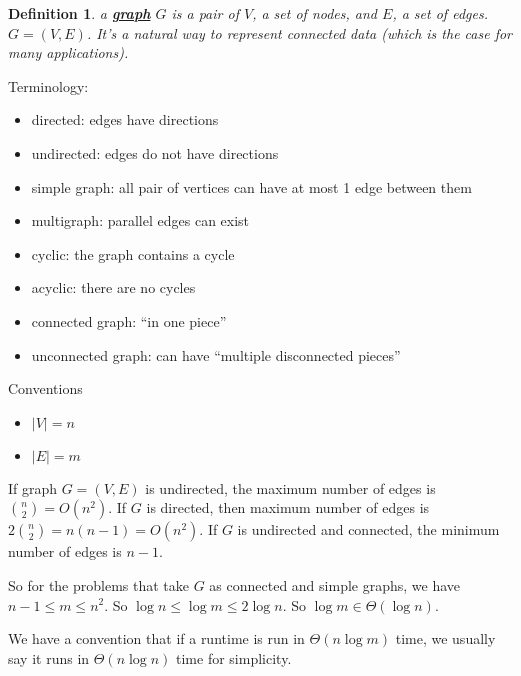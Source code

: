 \documentclass[twoside]{article}
\newtheorem{protodefinition}[prototheorem]{Definition}
\newenvironment{definition}
{\colorlet{shadecolor}{cyan!15}\begin{shaded}\begin{protodefinition}\normalfont}
		{\end{protodefinition}\end{shaded}}
\begin{document}
\begin{definition}
	a \textbf{\underline{graph}} $G$ is a pair of $V$, a set of nodes, and $E$, a set of edges. $G = (V, E)$. It's a natural way to represent connected data (which is the case for many applications). 
\end{definition}
Terminology: 
\begin{itemize}
	\item directed: edges have directions
	\item undirected: edges do not have directions
	\item simple graph: all pair of vertices can have at most 1 edge between them
	\item multigraph: parallel edges can exist
	\item cyclic: the graph contains a cycle
	\item acyclic: there are no cycles
	\item connected graph: ``in one piece''
	\item unconnected graph: can have ``multiple disconnected pieces''
\end{itemize}
Conventions
\begin{itemize}
	\item $|V| = n$
	\item $|E| = m$
\end{itemize}

If graph $G = (V, E)$ is undirected, the maximum number of edges is ${n \choose 2} = O(n^2)$. If $G$ is directed, then maximum number of edges is $2{n \choose 2} = n(n-1) = O(n^2)$. If $G$ is undirected and connected, the minimum number of edges is $n-1$. 

So for the problems that take $G$ as connected and simple graphs, we have $n-1 \leq m \leq n^2$. So $\log n \leq \log m \leq 2 \log n$. So $\log m \in \Theta(\log n)$. 

We have a convention that if a runtime is run in $\Theta(n\log m)$ time, we usually say it runs in $\Theta(n\log n)$ time for simplicity. 
\end{document}
